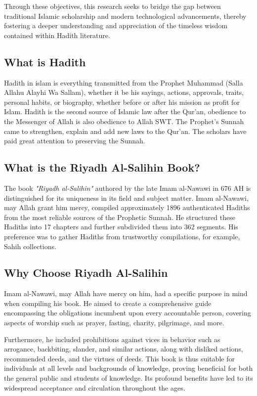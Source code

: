 Through these objectives, this research seeks to bridge the gap between traditional Islamic scholarship and modern technological advancements, thereby fostering a deeper understanding and appreciation of the timeless wisdom contained within Hadith literature.


\subsection{What is Hadith}
Hadith in islam is everything transmitted from the Prophet Muhammad (Salla Allahu Alayhi Wa Sallam), whether it be his sayings, actions, approvals, traits, personal habits, or biography, whether before or after his mission as profit for Islam. Hadith is the second source of Islamic law after the Qur'an, obedience to the Messenger of Allah is also obedience to Allah SWT. The Prophet's Sunnah came to strengthen, explain and add new laws to the Qur'an. The scholars have paid great attention to preserving the Sunnah.
\subsection{What is the Riyadh Al-Salihin Book?}

The book \textit{"Riyadh al-Salihin"} authored by the late Imam al-Nawawi in 676 AH is distinguished for its uniqueness in its field and subject matter. Imam al-Nawawi, may Allah grant him mercy, compiled approximately 1896 authenticated Hadiths from the most reliable sources of the Prophetic Sunnah. He structured these Hadiths into 17 chapters and further subdivided them into 362 segments. His preference was to gather Hadiths from trustworthy compilations, for example, Sahih collections. \cite{site1}


\subsection{Why Choose Riyadh Al-Salihin}

Imam al-Nawawi, may Allah have mercy on him, had a specific purpose in mind when compiling his book. He aimed to create a comprehensive guide encompassing the obligations incumbent upon every accountable person, covering aspects of worship such as prayer, fasting, charity, pilgrimage, and more. 

Furthermore, he included prohibitions against vices in behavior such as arrogance, backbiting, slander, and similar actions, along with disliked actions, recommended deeds, and the virtues of deeds. This book is thus suitable for individuals at all levels and backgrounds of knowledge, proving beneficial for both the general public and students of knowledge. Its profound benefits have led to its widespread acceptance and circulation throughout the ages.

